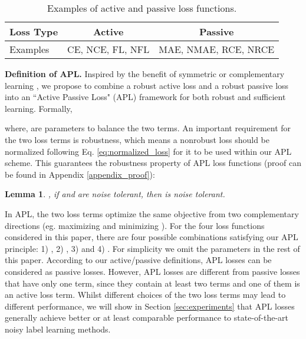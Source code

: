 \documentclass{article}
\newtheorem{lemma}{Lemma}
\begin{document}
\begin{table}[!ht]
\vspace{-0.1 in}
\caption{Examples of active and passive loss functions.}
\label{tab:summary}
\centering
\begin{adjustbox}{width=1\linewidth}
\small
\begin{tabular}{l|c|c}
\hline
Loss Type & Active & Passive \\ \hline
 Examples & CE, NCE, FL, NFL & MAE, NMAE, RCE, NRCE \\
 \hline
\end{tabular}
\end{adjustbox}
\vspace{-0.1 in}
\end{table}

\noindent\textbf{Definition of APL.} Inspired by the benefit of symmetric \cite{wang2019symmetric} or complementary learning \cite{kim2019nlnl}, we propose to combine a robust active loss and a robust passive loss into an ``Active Passive Loss" (APL) framework for both robust and sufficient learning. Formally,

where,  are parameters to balance the two terms.
An important requirement for the two loss terms is robustness, which means a nonrobust loss should be normalized following Eq. \eqref{eq:normalized_loss} for it to be used within our APL scheme. This guarantees the robustness property of APL loss functions (proof can be found in Appendix \ref{appendix_proof}):

\begin{lemma}\label{lemma_3}
, if  and  are noise tolerant, then  is noise tolerant.
\end{lemma}


In APL, the two loss terms optimize the same objective from two complementary directions (eg. maximizing  and minimizing ). 
For the four loss functions considered in this paper, there are four possible combinations satisfying our APL principle: 1) , 2) , 3)  and 4) . For simplicity we omit the parameters  in the rest of this paper. 
According to our active/passive definitions, APL losses can be considered as passive losses. However, APL losses are different from passive losses that have only one term, since they contain at least two terms and one of them is an active loss term.
Whilst different choices of the two loss terms may lead to different performance, we will show in Section \ref{sec:experiments} that APL losses generally achieve better or at least comparable performance to state-of-the-art noisy label learning methods.
\end{document}
